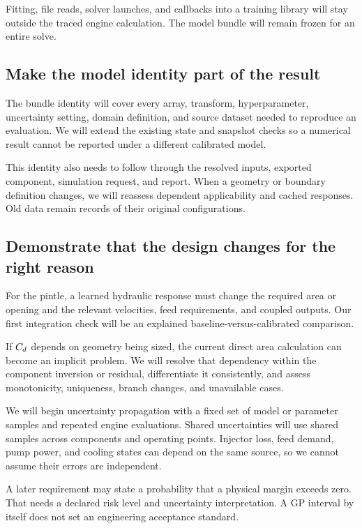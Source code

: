 Fitting, file reads, solver launches, and callbacks into a training library will stay outside the traced engine calculation. The model bundle will remain frozen for an entire solve.

\subsection{Make the model identity part of the result}

The bundle identity will cover every array, transform, hyperparameter, uncertainty setting, domain definition, and source dataset needed to reproduce an evaluation. We will extend the existing state and snapshot checks so a numerical result cannot be reported under a different calibrated model.

This identity also needs to follow through the resolved inputs, exported component, simulation request, and report. When a geometry or boundary definition changes, we will reassess dependent applicability and cached responses. Old data remain records of their original configurations.

\subsection{Demonstrate that the design changes for the right reason}

For the pintle, a learned hydraulic response must change the required area or opening and the relevant velocities, feed requirements, and coupled outputs. Our first integration check will be an explained baseline-versus-calibrated comparison.

If $C_d$ depends on geometry being sized, the current direct area calculation can become an implicit problem. We will resolve that dependency within the component inversion or residual, differentiate it consistently, and assess monotonicity, uniqueness, branch changes, and unavailable cases.

We will begin uncertainty propagation with a fixed set of model or parameter samples and repeated engine evaluations. Shared uncertainties will use shared samples across components and operating points. Injector loss, feed demand, pump power, and cooling states can depend on the same source, so we cannot assume their errors are independent.

A later requirement may state a probability that a physical margin exceeds zero. That needs a declared risk level and uncertainty interpretation. A GP interval by itself does not set an engineering acceptance standard.

